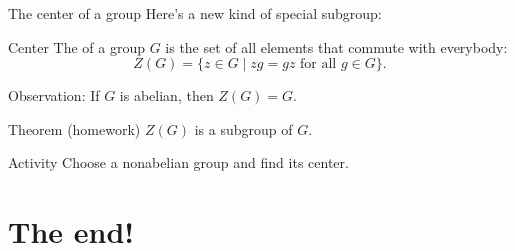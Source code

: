 \documentclass[8pt, handout]{beamer}
\newcommand{\Pause}{\pause}      %
\begin{document}

\begin{frame}{The center of a group}
  Here's a new kind of special subgroup:
  \begin{block}{Center}
    The  of a group $G$ is the set of all elements that commute with everybody: \Pause
    \[Z(G) = \{z\in G \mid zg = gz \text{ for all } g\in G\}.\]
  \end{block} \Pause
  Observation: If $G$ is abelian, then $Z(G) = G$. \Pause
  \begin{exampleblock}{Theorem (homework)}
    $Z(G)$ is a subgroup of $G$.
  \end{exampleblock} \Pause
  \begin{alertblock}{Activity}
    Choose a nonabelian group and find its center.
  \end{alertblock}
  
\end{frame}


\section{The end!}
\end{document}
